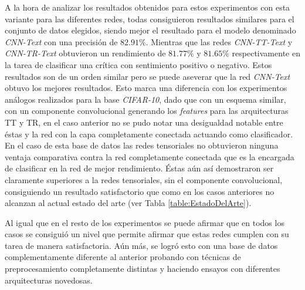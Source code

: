 \documentclass[spanish]{article}
\theoremstyle{definition}
\theoremstyle{remark}
\numberwithin{equation}{section}
\numberwithin{equation}{section} %
\begin{document}
\par
A la hora de analizar los resultados obtenidos para estos experimentos con esta variante para las diferentes redes, todas consiguieron resultados similares para el conjunto de datos elegidos, siendo mejor el resultado para el modelo denominado \textit{CNN-Text} con una precisión de $82.91\%$. Mientras que las redes \textit{CNN-TT-Text} y \textit{CNN-TR-Text} obtuvieron un rendimiento de $81.77\%$  y $81.65\%$ respectivamente en la tarea de clasificar una crítica con sentimiento positivo o negativo. Estos resultados son de un orden similar pero se puede aseverar que la red \textit{CNN-Text} obtuvo los mejores resultados. Esto marca una diferencia con los experimentos análogos realizados para la base \textit{CIFAR-10}, dado que con un esquema similar, con un componente convolucional generando los \textit{features} para las arquitecturas TT y TR, en el caso anterior no se pudo notar una desigualdad notable entre éstas y la red con la capa completamente conectada actuando como clasificador. En el caso de esta base de datos las redes tensoriales no obtuvieron ninguna ventaja comparativa contra la red completamente conectada que es la encargada de clasificar en la red de mejor rendimiento. Éstas aún así demostraron ser claramente superiores a la redes tensoriales, sin el componente convolucional, consiguiendo un resultado satisfactorio que como en los casos anteriores no alcanzan al actual estado del arte (ver Tabla \ref{table:EstadoDelArte}).
\par
Al igual que en el resto de los experimentos se puede afirmar que en todos los casos se consiguió un nivel que permite afirmar que estas redes cumplen con su tarea de manera satisfactoria. Aún más, se logró esto con una base de datos complementamente diferente al anterior probando con técnicas de preprocesamiento completamente distintas y haciendo ensayos con diferentes arquitecturas novedosas.
\par
\clearpage

\vspace*{0.25in}
\begin{center}
\end{center}
\vspace*{0.25in}
\normalsize 
\end{document}
